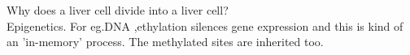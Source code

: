 \documentclass[a4paper]{article}
\begin{document}
Why does a liver cell divide into a liver cell? \\
Epigenetics. For eg.DNA ,ethylation silences gene expression and this is kind of an 'in-memory' process. The methylated sites are inherited too.
\end{document}
